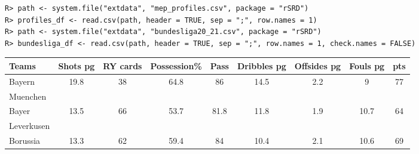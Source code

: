 \begin{verbatim}
R> path <- system.file("extdata", "mep_profiles.csv", package = "rSRD")
R> profiles_df <- read.csv(path, header = TRUE, sep = ";", row.names = 1)
R> path <- system.file("extdata", "bundesliga20_21.csv", package = "rSRD")
R> bundesliga_df <- read.csv(path, header = TRUE, sep = ";", row.names = 1, check.names = FALSE)
\end{verbatim}

%
\begin{table}[t]
\scriptsize
\begin{tabular}{lccccccc|c}
\hline
Teams         & \multicolumn{1}{c}{Shots pg} & \multicolumn{1}{c}{RY cards} & \multicolumn{1}{c}{Possession\%} & \multicolumn{1}{c}{Pass} & \multicolumn{1}{c}{Dribbles pg} & \multicolumn{1}{c}{Offsides pg} & \multicolumn{1}{c|}{Fouls pg} & \multicolumn{1}{c}{pts} \\ \hline
Bayern        & \multirow{2}{*}{19.8}        & \multirow{2}{*}{38}          & \multirow{2}{*}{64.8}            & \multirow{2}{*}{86}      & \multirow{2}{*}{14.5}           & \multirow{2}{*}{2.2}            & \multirow{2}{*}{9}            & \multirow{2}{*}{77}     \\
Muenchen        &                              &                              &                                  &                          &                                 &                                 &                               &                         \\
Bayer         & \multirow{2}{*}{13.5}        & \multirow{2}{*}{66}          & \multirow{2}{*}{53.7}            & \multirow{2}{*}{81.8}    & \multirow{2}{*}{11.8}           & \multirow{2}{*}{1.9}            & \multirow{2}{*}{10.7}         & \multirow{2}{*}{64}     \\
Leverkusen    &                              &                              &                                  &                          &                                 &                                 &                               &                         \\
Borussia      & \multirow{2}{*}{13.3}        & \multirow{2}{*}{62}          & \multirow{2}{*}{59.4}            & \multirow{2}{*}{84}      & \multirow{2}{*}{10.4}           & \multirow{2}{*}{2.1}            & \multirow{2}{*}{10.6}         & \multirow{2}{*}{69}     \\

\end{tabular}
\end{table}
